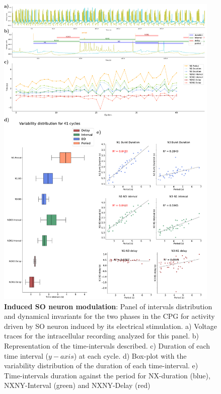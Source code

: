 \begin{figure}[htbp]
	\centering
	\includegraphics[width=0.95\textwidth]{./img/invariants/data/SUSSEX/SO_driven/images/panel_with_intervals.pdf}
	\caption{\textbf{Induced SO neuron modulation}: Panel of intervals distribution and dynamical invariants for the two phases in the CPG for activity driven by SO neuron induced by its electrical stimulation. a) Voltage traces for the intracellular recording analyzed for this panel. b) Representation of the time-intervals described. c) Duration of each time interval ($y-axis$) at each cycle. d) Box-plot with the variability distribution of the duration of each time-interval. e) Time-intervals duration against the period for NX-duration (blue), NXNY-Interval (green) and NXNY-Delay (red)}
	\label{fig:so induced invariants}
\end{figure}

